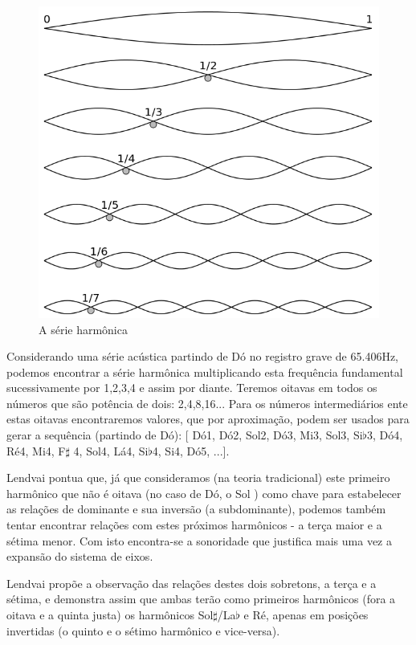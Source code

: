 \documentclass[
	12pt,				%
	openright,			%
	twoside,			%
	a4paper,			%
	english,			%
	french,				%
	spanish,			%
	brazil				%
	]{abntex2}
\begin{document}
\begin{figure}[!h]
	\caption{\label{fig_grafico}A série harmônica }
	\begin{center}
	    \includegraphics[scale=0.3]{axis/serie_harmonica.png}
	\end{center}
\end{figure}

Considerando uma série acústica partindo de Dó no registro grave de 65.406Hz, podemos encontrar a série harmônica multiplicando esta frequência fundamental sucessivamente por 1,2,3,4 e assim por diante. Teremos oitavas em todos os números que são potência de dois: 2,4,8,16... Para os números intermediários ente estas oitavas encontraremos valores, que por aproximação, podem ser usados para gerar a sequência (partindo de Dó): [ Dó1, Dó2, Sol2, Dó3, Mi3, Sol3, Si$\flat$3, Dó4, Ré4, Mi4, F$\sharp$ 4, Sol4, Lá4, Si$\flat$4, Si4, Dó5, ...].

Lendvai pontua que, já que consideramos (na teoria tradicional) este primeiro harmônico que não é oitava (no caso de Dó, o Sol ) como chave para estabelecer as relações de dominante e sua inversão (a subdominante), podemos também tentar encontrar relações com estes próximos harmônicos - a terça maior e a sétima menor. Com isto encontra-se a sonoridade que justifica mais uma vez a expansão do sistema de eixos.

Lendvai propõe a observação das relações destes dois sobretons, a terça e a sétima, e demonstra assim que ambas terão como primeiros harmônicos (fora a oitava e a quinta justa) os harmônicos Sol$\sharp$/La$\flat$  e Ré, apenas em posições invertidas (o quinto e o sétimo harmônico e vice-versa).
\end{document}
